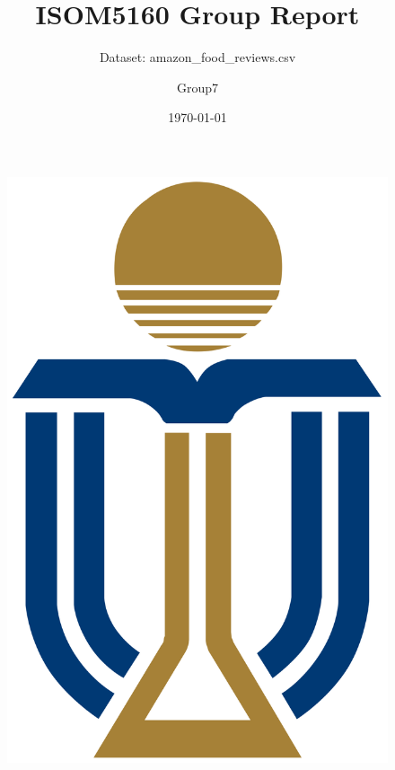 \documentclass[serif, aspectratio=169]{beamer}
\author{Group7}
\title{ISOM5160 Group Report}
\subtitle{Dataset: amazon\_food\_reviews.csv}
\institute{
    \scriptsize
	\begin{tabular}{llll}
		\toprule
		CAO, Xi & 21271664 & LI, Heyi & 21265689  \\
		LIAO, Jingyu & 21262106 & LIN, Chuwei & 21237955  \\
		YE, Chenwei & 21199517 & ZHANG, Ziyang & 21266920  \\
		\bottomrule
	\end{tabular}
	\normalsize
}
\date{\small \today}
\begin{document}
\begin{frame}
    \titlepage
    \vspace*{-0.6cm}
    \begin{figure}[htpb]
        \begin{center}
            \includegraphics[keepaspectratio, scale=0.02]{pic/UST.png}
        \end{center}
    \end{figure}
\end{frame}

\begin{frame}    
\tableofcontents[sectionstyle=show,
subsectionstyle=show/shaded/hide,
subsubsectionstyle=show/shaded/hide]
\end{frame}
\end{document}
